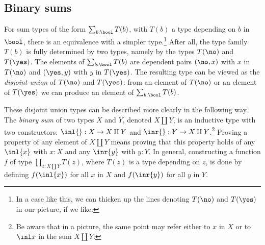 \subsection{Binary sums}
\label{sec:binsum-types}
For sum types of the form $\sum_{b:\bool} T(b)$, with $T(b)$
a type depending on $b$ in $\bool$, there is an equivalence with a simpler type.\footnote{%
  In a case like this, we can thicken up the lines denoting
  $T(\no)$ and $T(\yes)$ in our picture, if we like:\par
  }
After all, the type family $T(b)$ is fully determined
by two types, namely by the types $T(\no)$ and $T(\yes)$.
The elements of $\sum_{b:\bool} T(b)$ are dependent pairs $(\no,x)$ with
$x$ in $T(\no)$ and $(\yes,y)$ with $y$ in $T(\yes)$. The resulting
type can be viewed as the \emph{disjoint union} of $T(\no)$ and $T(\yes)$:
from an element of $T(\no)$ or an element of $T(\yes)$
we can produce an element of $\sum_{b:\bool} T(b)$.

These disjoint union types can be described more clearly in the following way.
The \emph{binary sum} of two types $X$ and $Y$, denoted $X \amalg Y$,
is an inductive type with two constructors: $\inl{} : X \to X \amalg Y$ and
$\inr{} : Y \to X \amalg Y$.\footnote{%
  Be aware that in a picture, the same point may refer
  either to $x$ in $X$ or to $\inl x$ in the sum $X \amalg Y$:\par
  }
Proving a property of any element of $X \amalg Y$
means proving that this property holds of any $\inl{x}$ with $x:X$ and any
$\inr{y}$ with $y:Y$. In general, constructing a function $f$ of type
$\prod_{z: X \amalg Y} T(z)$, where $T(z)$ is a type depending on
$z$, is done by defining $f(\inl{x})$ for all $x$ in $X$
and $f(\inr{y})$ for all $y$ in $Y$.

